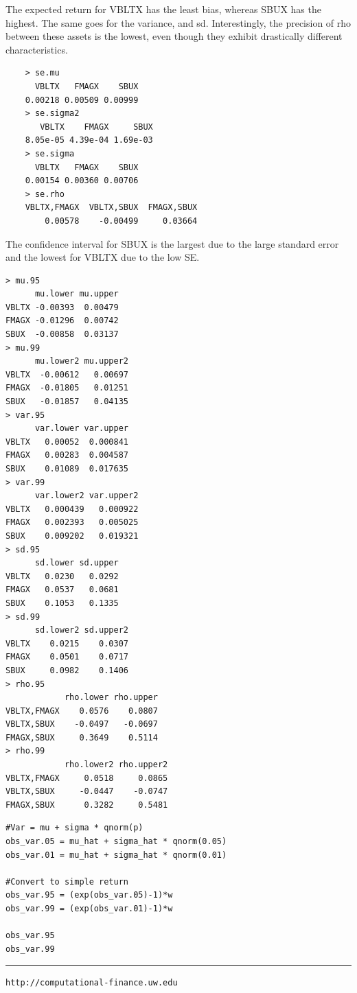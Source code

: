 \documentclass[letterpaper,12pt]{article}
\begin{document}
\item The expected return for VBLTX has the least bias, whereas SBUX has the highest. The same goes for the variance, and sd. Interestingly, the precision of rho between these assets is the lowest, even though they exhibit drastically different characteristics.
\begin{lstlisting}
    > se.mu
      VBLTX   FMAGX    SBUX 
    0.00218 0.00509 0.00999 
    > se.sigma2
       VBLTX    FMAGX     SBUX 
    8.05e-05 4.39e-04 1.69e-03 
    > se.sigma
      VBLTX   FMAGX    SBUX 
    0.00154 0.00360 0.00706 
    > se.rho
    VBLTX,FMAGX  VBLTX,SBUX  FMAGX,SBUX 
        0.00578    -0.00499     0.03664 
\end{lstlisting}

\item The confidence interval for SBUX is the largest due to the large standard error and the lowest for VBLTX due to the low SE.

\begin{lstlisting}
> mu.95
      mu.lower mu.upper
VBLTX -0.00393  0.00479
FMAGX -0.01296  0.00742
SBUX  -0.00858  0.03137
> mu.99
      mu.lower2 mu.upper2
VBLTX  -0.00612   0.00697
FMAGX  -0.01805   0.01251
SBUX   -0.01857   0.04135
> var.95
      var.lower var.upper
VBLTX   0.00052  0.000841
FMAGX   0.00283  0.004587
SBUX    0.01089  0.017635
> var.99
      var.lower2 var.upper2
VBLTX   0.000439   0.000922
FMAGX   0.002393   0.005025
SBUX    0.009202   0.019321
> sd.95
      sd.lower sd.upper
VBLTX   0.0230   0.0292
FMAGX   0.0537   0.0681
SBUX    0.1053   0.1335
> sd.99
      sd.lower2 sd.upper2
VBLTX    0.0215    0.0307
FMAGX    0.0501    0.0717
SBUX     0.0982    0.1406
> rho.95
            rho.lower rho.upper
VBLTX,FMAGX    0.0576    0.0807
VBLTX,SBUX    -0.0497   -0.0697
FMAGX,SBUX     0.3649    0.5114
> rho.99
            rho.lower2 rho.upper2
VBLTX,FMAGX     0.0518     0.0865
VBLTX,SBUX     -0.0447    -0.0747
FMAGX,SBUX      0.3282     0.5481
\end{lstlisting}

\item \begin{lstlisting}
#Var = mu + sigma * qnorm(p)
obs_var.05 = mu_hat + sigma_hat * qnorm(0.05)
obs_var.01 = mu_hat + sigma_hat * qnorm(0.01)

#Convert to simple return
obs_var.95 = (exp(obs_var.05)-1)*w
obs_var.99 = (exp(obs_var.01)-1)*w

obs_var.95
obs_var.99
\end{lstlisting}
\vfill \hrule \vspace{2mm} \centerline {\tt \tiny http://computational-finance.uw.edu}
\end{document}

